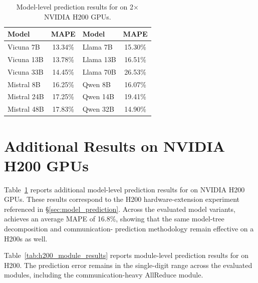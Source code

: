 

\begin{table}[t]
\centering
\small
\setlength{\tabcolsep}{5pt}
\renewcommand{\arraystretch}{1.05}

\begin{tabular}{lclc}
\toprule
\textbf{Model} & \textbf{MAPE} & \textbf{Model} & \textbf{MAPE} \tabularnewline
\midrule
\rowcolor{rowblue} Vicuna 7B  & 13.34\% & Llama 7B  & 15.30\% \tabularnewline
Vicuna 13B                    & 13.78\% & Llama 13B & 16.51\% \tabularnewline
\rowcolor{rowblue} Vicuna 33B & 14.45\% & Llama 70B & 26.53\% \tabularnewline
Mistral 8B                    & 16.25\% & Qwen 8B   & 16.07\% \tabularnewline
\rowcolor{rowblue} Mistral 24B & 17.25\% & Qwen 14B  & 19.41\% \tabularnewline
Mistral 48B                   & 17.83\% & Qwen 32B  & 14.90\% \tabularnewline
\bottomrule
\end{tabular}

\vspace{-6pt}
\caption{Model-level prediction results for \sys{} on 2$\times$ NVIDIA H200 GPUs.}
\label{tab:h200_model_results}
\vspace{-6pt}
\end{table}


\section{Additional Results on NVIDIA H200 GPUs}
\label{app:additional_perf_results}

Table~\ref{tab:h200_model_results} reports additional model-level prediction results for \sys{} on NVIDIA H200 GPUs. 
These results correspond to the H200 hardware-extension experiment referenced in \S\ref{sec:model_prediction}. 
Across the evaluated model variants, \sys{} achieves an average MAPE of 16.8\%, showing that the same model-tree decomposition and communication- prediction methodology remain effective on a H200s as well.


Table~\ref{tab:h200_module_results} reports module-level prediction results for \sys{} on H200. 
The prediction error remains in the single-digit range across the evaluated modules, including the communication-heavy AllReduce module.



